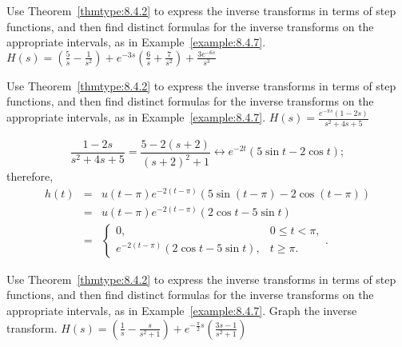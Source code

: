 \documentclass{ximera}
\begin{document}
\begin{problem}\label{exer:8.4.23} Use Theorem~\ref{thmtype:8.4.2} to express the inverse transforms in terms of step functions, and then find distinct formulas for the inverse transforms on the appropriate intervals, as in
Example~\ref{example:8.4.7}.
$H(s)=\left(\frac{5}{s}-\frac{1}{s^2}\right)
+e^{-3s}\left(\frac{6}{s}+\frac{7}{s^2}\right)+\frac{3e^{-6s}}{s^3}$
\end{problem}

\begin{problem}\label{exer:8.4.24}
Use Theorem~\ref{thmtype:8.4.2} to express the inverse transforms in terms of step functions, and then find distinct formulas for the inverse transforms on the appropriate intervals, as in
Example~\ref{example:8.4.7}.
$H(s)=\frac{e^{-\pi s} (1-2s)}{s^2+4s+5}$

\begin{solution}
$$
\frac{1-2s}{s^2+4s+5}=\frac{5-2(s+2)}{(s+2)^2+1}\leftrightarrow
e^{-2t}(5\sin t-2\cos t);
$$
therefore,
\begin{eqnarray*}
h(t)&=&u(t-\pi)e^{-2(t-\pi)} \left(5\sin(t-\pi)-2\cos(t-\pi)\right)\\
&=&u(t-\pi)e^{-2(t-\pi)} (2\cos t-5\sin t)\\
&=&\left\{\begin{array}{cl} 0, &0\le t<\pi,\\
e^{-2(t-\pi)}(2\cos t-5\sin t),&t\ge\pi. \end{array}\right..
\end{eqnarray*}
\end{solution}
\end{problem}

\begin{problem}\label{exer:8.4.25} Use Theorem~\ref{thmtype:8.4.2} to express the inverse transforms in terms of step functions, and then find distinct formulas for the inverse transforms on the appropriate intervals, as in
Example~\ref{example:8.4.7}.  Graph the inverse transform.
$H(s)=\left(\frac{1}{s}-\frac{s}{s^2+1}\right)+e^{-\frac{\pi}{2}s}\left(\frac{3s-1}{s^2+1}\right)$
\end{problem}
\end{document}
